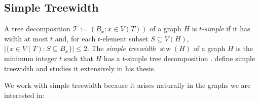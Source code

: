 \documentclass[kpfonts]{patmorin}
\newcommand{\defin}[1]{\emph{\color{brightmaroon}#1}}
\DeclareMathOperator{\stw}{stw}
\theoremstyle{named}
\begin{document}
%

\subsection{Simple Treewidth}


A tree decomposition $\mathcal{T}:=(B_x:x\in V(T))$ of a graph $H$ is \defin{$t$-simple} if it has width at most $t$ and, for each $t$-element subset $S\subseteq V(H)$, $|\{x\in V(T):S\subseteq B_x\}|\le 2$.  The \defin{simple treewidth} $\stw(H)$ of a graph $H$ is the minimum integer $t$ such that $H$ has a $t$-simple tree decomposition \cite{knauer.ueckerdt:simple}.  \citet{knauer.ueckerdt:simple} define simple treewidth and  \citet{wulf:stacked} studies it extensively in his thesis.

%

We work with simple treewidth because it arises naturally in the graphs we are interested in:
\end{document}

